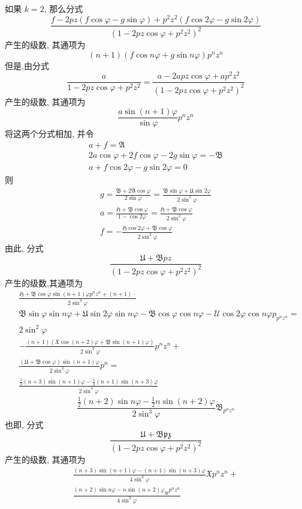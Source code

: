如果 $k=2$, 那么分式
\[
\frac{f-2 p z(f \cos \varphi-g \sin \varphi)+p^{2} z^{2}(f \cos 2 \varphi-g \sin 2 \varphi)}{\left(1-2 p z \cos \varphi+p^{2} z^{2}\right)^{2}}
\]
产生的级数, 其通项为
\[
(n+1)(f \cos n \varphi+g \sin n \varphi) p^{n} z^{n}
\]
但是,由分式
\[
\frac{a}{1-2 p z \cos \varphi+p^{2} z^{2}}=\frac{a-2 a p z \cos \varphi+a p^{2} z^{2}}{\left(1-2 p z \cos \varphi+p^{2} z^{2}\right)^{2}}
\]
产生的级数, 其通项为
\[
\frac{a \sin (n+1) \varphi}{\sin \varphi} p^{n} z^{n}
\]
将这两个分式相加, 并令
\[
\begin{gathered}
a+f=\mathfrak{A} \\
2 a \cos \varphi+2 f \cos \varphi-2 g \sin \varphi=-\mathfrak{B} \\
a+f \cos 2 \varphi-g \sin 2 \varphi=0
\end{gathered}
\]
则
\[
\begin{gathered}
g=\frac{\mathfrak{B}+2 \mathfrak{A} \cos \varphi}{2 \sin \varphi}=\frac{\mathfrak{B} \sin \varphi+\mathfrak{U} \sin 2 \varphi}{2 \sin ^{2} \varphi} \\
a=\frac{\mathfrak{H}+\mathfrak{B} \cos \varphi}{1-\cos 2 \varphi}=\frac{\mathfrak{H}+\mathfrak{B} \cos \varphi}{2 \sin ^{2} \varphi} \\
f=-\frac{\mathfrak{H} \cos 2 \varphi+\mathfrak{B} \cos \varphi}{2 \sin ^{2} \varphi}
\end{gathered}
\]
由此, 分式
\[
\frac{\mathfrak{U}+\mathfrak{B} p z}{\left(1-2 p z \cos \varphi+p^{2} z^{2}\right)^{2}}
\]
产生的级数,其通项为
\[
\begin{aligned}
& \frac{\mathfrak{H}+\mathfrak{B} \cos \varphi \sin (n+1) \varphi p^{n} z^{n}+(n+1) \cdot}{2 \sin ^{3} \varphi} \\
& \mathfrak{B} \sin \varphi \sin n \varphi+\mathfrak{U} \sin 2 \varphi \sin n \varphi-\mathfrak{B} \cos \varphi \cos n \varphi-\mathscr{U} \cos 2 \varphi \cos n \varphi p_{p^{n} z^{n}}= \\
& 2 \sin ^{2} \varphi \\
& -\frac{(n+1)(\mathfrak{X} \cos (n+2) \varphi+\mathfrak{B} \sin (n+1) \varphi)}{2 \sin ^{2} \varphi} p^{n} z^{n}+ \\
& \frac{(\mathfrak{U}+\mathfrak{B} \cos \varphi) \sin (n+1) \varphi}{2 \sin ^{3} \varphi} p^{n}= \\
& \frac{\frac{1}{2}(n+3) \sin (n+1) \varphi-\frac{1}{2}(n+1) \sin (n+3) \varphi}{2 \sin ^{3} \varphi}
\end{aligned}
\]
\[
 \frac{\frac{1}{2}(n+2) \sin n \varphi-\frac{1}{2} n \sin (n+2) \varphi}{2 \sin ^{3} \varphi} \mathfrak{B}_{p^{n} z^{n}}
\]
也即, 分式
\[
\frac{\mathfrak{U}+\mathfrak{B p z}}{\left(1-2 p z \cos \varphi+p^{2} z^{2}\right)^{2}}
\]
产生的级数, 其通项为
\[
\begin{gathered}
\frac{(n+3) \sin (n+1) \varphi-(n+1) \sin (n+3) \varphi}{4 \sin ^{3} \varphi} \mathfrak{X} p^{n} z^{n}+ \\
\frac{(n+2) \sin n \varphi-n \sin (n+2) \varphi_{\mathfrak{B}} p^{n} z^{n}}{4 \sin ^{3} \varphi} 
\end{gathered}
\]
